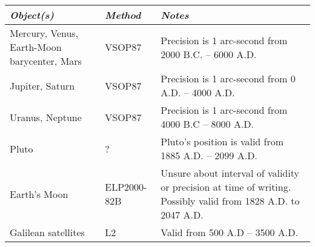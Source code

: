 \begin{longtabu} to \textwidth {X|l|X}
\toprule
\emph{Object(s)} & \emph{Method} & \emph{Notes}\tabularnewline
\midrule
Mercury, Venus, Earth-Moon barycenter, Mars & VSOP87 & Precision is 1
arc-second from 2000 B.C. -- 6000 A.D.\tabularnewline
\midrule
Jupiter, Saturn & VSOP87 & Precision is 1 arc-second from 0 A.D. -- 4000
A.D.\tabularnewline
\midrule
Uranus, Neptune & VSOP87 & Precision is 1 arc-second from 4000 B.C --
8000 A.D.\tabularnewline
\midrule
Pluto & ? & Pluto's position is valid from 1885 A.D. -- 2099
A.D.\tabularnewline
\midrule
Earth's Moon & ELP2000-82B & Unsure about interval of validity or
precision at time of writing. Possibly valid from 1828 A.D. to 2047
A.D.\tabularnewline
\midrule
Galilean satellites & L2 & Valid from 500 A.D -- 3500
A.D.\tabularnewline
\bottomrule
\end{longtabu}

